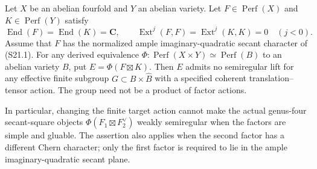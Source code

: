 \begin{proposition}
\label{prop:semireg-correlated-products}
Let $X$ be an abelian fourfold and $Y$ an abelian variety.
Let $F\in\operatorname{Perf}(X)$ and
$K\in\operatorname{Perf}(Y)$ satisfy
\[
 \operatorname{End}(F)=\operatorname{End}(K)=\mathbf C,
 \qquad \operatorname{Ext}^{j}(F,F)=
        \operatorname{Ext}^{j}(K,K)=0\quad(j<0).
 \tag{S25.1}
\]
Assume that $F$ has the normalized ample
imaginary-quadratic secant character of (S21.1).
For any derived equivalence
$\Phi:\operatorname{Perf}(X\times Y)\simeq
\operatorname{Perf}(B)$ to an abelian variety $B$, put
$E=\Phi(F\boxtimes K)$.
Then $E$ admits no semiregular lift for any effective
finite subgroup $G\subset B\times\widehat B$ with a
specified coherent translation--tensor action.
The group need not be a product of factor actions.

In particular, changing the finite target action cannot
make the actual genus-four secant-square objects
$\Phi(F_1\boxtimes F_2^\vee)$ weakly semiregular when the
factors are simple and gluable. The assertion also applies
when the second factor has a different Chern character;
only the first factor is required to lie in the ample
imaginary-quadratic secant plane.
\end{proposition}
